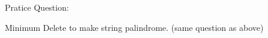 \begin{pratice}
    Pratice Question:
    \begin{asparaenum}[(a)]
        \item Minimum Delete to make string palindrome. (same question as above)
    \end{asparaenum}
\end{pratice}